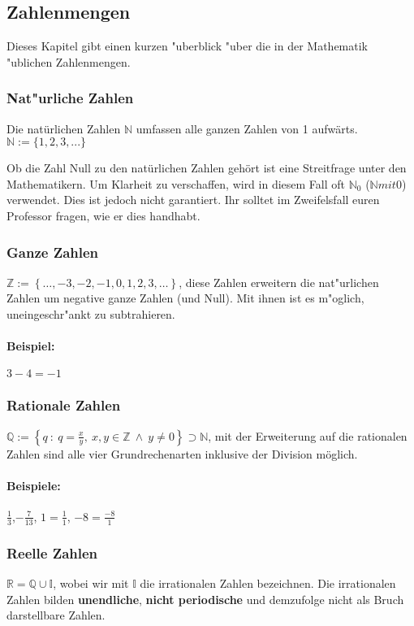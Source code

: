 \subsection{Zahlenmengen}
Dieses Kapitel gibt einen kurzen "uberblick "uber die in der Mathematik "ublichen Zahlenmengen.

\subsubsection{Nat"urliche Zahlen}
Die natürlichen Zahlen $\mathbb{N}$ umfassen alle ganzen Zahlen von 1 aufwärts.\\
$\mathbb{N} := \{1, 2, 3, ...\}$
\begin{warning}
	Ob die Zahl Null zu den natürlichen Zahlen gehört ist eine Streitfrage unter den Mathematikern. Um Klarheit zu verschaffen, wird in diesem Fall oft $\mathbb{N}_0$ ($\mathbb{N} mit 0$) verwendet. Dies ist jedoch nicht garantiert. Ihr solltet im Zweifelsfall euren Professor fragen, wie er dies handhabt.
\end{warning}

\subsubsection{Ganze Zahlen}
$\mathbb{Z} := \left\{\ldots, -3, -2, -1, 0, 1, 2, 3, \ldots \right\}$, diese Zahlen erweitern die nat"urlichen Zahlen um negative ganze Zahlen (und Null). Mit ihnen ist es m"oglich, uneingeschr"ankt zu subtrahieren.
\paragraph{Beispiel: } $3 - 4 = -1$

\subsubsection{Rationale Zahlen}
$\mathbb{Q} := \left\{ q \  : \ q = \frac{x}{y}, \ x,y \in \mathbb{Z} \  \land \ y \neq 0 \right\} \supset \mathbb{N}$, mit der Erweiterung auf die rationalen Zahlen sind alle vier Grundrechenarten inklusive der Division möglich.

\paragraph{Beispiele: } $\frac{1}{3}$,$-\frac{7}{13}$, $1 = \frac{1}{1}$, $-8 =\frac{-8}{1}$

\subsubsection{Reelle Zahlen}
$\mathbb{R} = \mathbb{Q} \cup \mathbb{I}$, wobei wir mit $\mathbb{I}$ die irrationalen Zahlen bezeichnen. Die irrationalen Zahlen bilden \textbf{unendliche}, \textbf{nicht periodische} und demzufolge nicht als Bruch darstellbare Zahlen.

